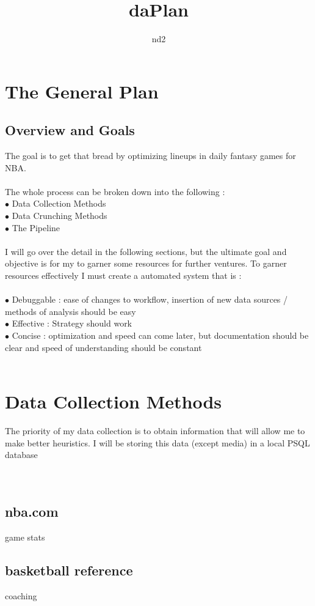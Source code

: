 \documentclass[11pt, oneside]{book}   	%
\title{daPlan}
\author{nd2}
\begin{document}
\maketitle
\chapter{The General Plan}
\section{Overview and Goals}
The goal is to get that bread by optimizing lineups in daily fantasy games for NBA.\\
\\
The whole process can be broken down into the following : \\
$\bullet$ Data Collection Methods\\
$\bullet$ Data Crunching Methods\\
$\bullet$ The Pipeline \\
\\
I will go over the detail in the following sections, but the ultimate goal and objective is for my to garner some resources for further ventures. To garner resources effectively I must create a automated system that is :\\
\\
$\bullet$ Debuggable : ease of changes to workflow, insertion of new data sources / methods of analysis should be easy\\
$\bullet$ Effective : Strategy should work\\
$\bullet$ Concise : optimization and speed can come later, but documentation should be clear and speed of understanding should be constant\\
\\
\chapter{Data Collection Methods}
The priority of my data collection is to obtain information that will allow me to make better heuristics. I will be storing this data (except media) in a local PSQL database \\
\\
\\
\section{nba.com}
game stats
\section{basketball reference}
coaching
\end{document}
